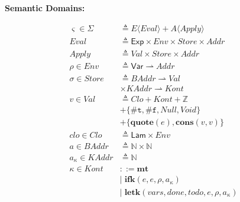 \documentclass[12pt,draft]{article}
\newcommand{\truesyn}{\texttt{\#t}}
\newcommand{\falsesyn}{\texttt{\#f}}
\newcommand{\env}[0]{\rho}
\newcommand{\kaddr}[0]{a_{\kappa}}
\begin{document}
{\begin{multicols*}{2}
\vfill\null
\columnbreak


\begin{center}
\textbf{Semantic Domains:}
\end{center}
\vspace{-8mm}
\begin{align*}
  \varsigma \in \Sigma &\triangleq E\langle\textit{Eval}\rangle
                         + A\langle\textit{Apply}\rangle \\
  \textit{Eval} &\triangleq \textsf{Exp} \times \textit{Env}
                  \times \textit{Store} \times \textit{Addr} \\
  \textit{Apply} &\triangleq \textit{Val} \times \textit{Store}
                   \times \textit{Addr} \\
  \rho \in \textit{Env} &\triangleq \textsf{Var} \rightharpoonup
	  											\textit{Addr} \\
  \sigma \in \textit{Store} &\triangleq \textit{BAddr} \rightharpoonup
                              \textit{Val} \\
  & \times \textit{KAddr} \rightharpoonup \textit{Kont} \\
  v \in \textit{Val} &\triangleq \textit{Clo} + \textit{Kont} + \mathbb{Z} \\
                     &+ \{ \truesyn,\falsesyn, \textit{Null} , \textit{Void} \} \\
                     &+ \{\textbf{quote}(e) , \textbf{cons}(v, v)\} \\
  clo \in \textit{Clo} &\triangleq \textsf{Lam} \times \textit{Env} \\
  a \in \textit{BAddr} &\triangleq \mathbb{N} \times \mathbb{N} \\
  a_\kappa \in \textit{KAddr} &\triangleq \mathbb{N} \\
  \kappa \in \textit{Kont} &::= \textbf{mt} \\
                     &|\; \textbf{ifk}(e, e, \env, \kaddr) \\
                     &|\; \textbf{letk}(vars, done, todo, e, \env , \kaddr) \\

\end{align*}
\end{multicols*}}
\end{document}
